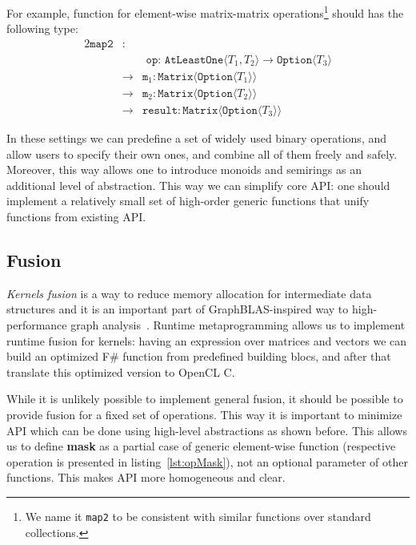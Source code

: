 For example, function for element-wise matrix-matrix operations\footnote{We name it \texttt{map2} to be consistent with similar functions over standard collections.} should has the following type:
\begin{alignat*}{2}
    \texttt{map2} & : & \\ 
        &   & \texttt{ op: AtLeastOne} \langle T_1, T_2 \rangle \to \texttt{Option} \langle T_3 \rangle \\
        & \to & \texttt{m}_1: \texttt{Matrix} \langle \texttt{Option} \langle T_1\rangle \rangle \\
        & \to & \texttt{m}_2: \texttt{Matrix} \langle \texttt{Option} \langle T_2 \rangle \rangle \\
        & \to & \texttt{result}: \texttt{Matrix} \langle \texttt{Option} \langle T_3\rangle \rangle
\end{alignat*}

In these settings we can predefine a set of widely used binary operations, and allow users to specify their own ones, and combine all of them freely and safely.
Moreover, this way allows one to introduce monoids and semirings as an additional level of abstraction. This way we can simplify core API: one should implement a relatively small set of high-order generic functions that unify functions from existing API. 

\subsection{Fusion}

\textit{Kernels fusion} is a way to reduce memory allocation for intermediate data structures and it is an important part of GraphBLAS-inspired way to high-performance graph analysis~\cite{10.1145/3466795}. Runtime metaprogramming allows us to implement runtime fusion for kernels: having an expression over matrices and vectors we can build an optimized F\# function from predefined building blocs, and after that translate this optimized version to OpenCL C.

While it is unlikely possible to implement general fusion, it should be possible to provide fusion for a fixed set of operations. This way it is important to minimize API which can be done using high-level abstractions as shown before. This allows us to define \textbf{mask} as a partial case of generic element-wise function (respective operation is presented in listing~\ref{lst:opMask}), not an optional parameter of other functions.
This makes API more homogeneous and clear.
 
